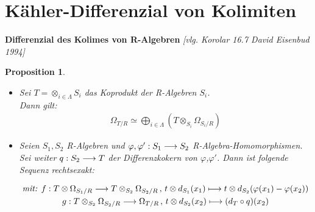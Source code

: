 \documentclass[10pt,a4paper]{report}
\newcommand{\comment}[1]{}
\newcommand{\ModulsOfDifferenzials}{David Eisenbud 1994}
\newcounter{Aussage}[chapter]
\newtheorem{prop}[Aussage]{Proposition}
\newcommand{\functionfront}[3]{\nolinebreak{#1:#2 \longrightarrow #3}}
\newcommand{\function}[5]{\nolinebreak{#1:#2 \longrightarrow #3 \, , \, #4 \longmapsto #5}}
\newcommand{\divR}[2]{\Omega_{#1/#2}}
\newcommand{\divf}[1]{d_{#1}}
\newcommand{\Tensor}[3]{#1 \otimes_{#2} #3}
\newcommand{\tensor}[3]{#1 \otimes #3}
\begin{document}
\section{Kähler-Differenzial von Kolimiten}

\textbf{Differenzial des Kolimes von R-Algebren} \textit{[vlg. Korolar 16.7 \ModulsOfDifferenzials]}
\comment{Beide Beweise sind sehr kurz gefasst}
\begin{prop} \label{Differenzial des Kolimes von R-Algebren}
\ \\
\begin{itemize}
\item[\textbf{1.}]
Sei $T = \otimes_{i \in \Lambda} S_i$ das Koprodukt der R-Algebren $S_i$.\\
Dann gilt:
\begin{gather*}
\divR{T}{R} \simeq \bigoplus_{i\in \Lambda} ( \Tensor{T}{S_i}{\divR{S_i}{R}} )
\end{gather*}
\item[\textbf{2.}]
Seien $S_1,S_2$ R-Algebren und $\functionfront{\varphi,\varphi'}{S_1}{S_2}$ R-Algebra-Homomorphismen. Sei weiter $\functionfront{q}{S_2}{T}$ der Differenzkokern von $\varphi$,$\varphi '$.
Dann ist folgende Sequenz rechtsexakt:
\begin{center}
\begin{gather*}
\textit{mit: } \function{f}{\tensor{T}{S_1}{\divR{S_1}{R}}}{\Tensor{T}{S_2}{\divR{S_2}{R}}}{\tensor{t}{S_2}{\divf{S_1}(x_1)}}{\tensor{t}{S_2}{\divf{S_2}(\varphi(x_1) - \varphi(x_2))}}\\
\function{g}{\Tensor{T}{S_2}{\divR{S_2}{R}}}{\divR{T}{R}}{\tensor{t}{S_2}{\divf{S_2}(x_2)}}{(\divf{T}\circ q)(x_2)}
\end{gather*}
\end{center}
\end{itemize}
\end{prop}
\end{document}
